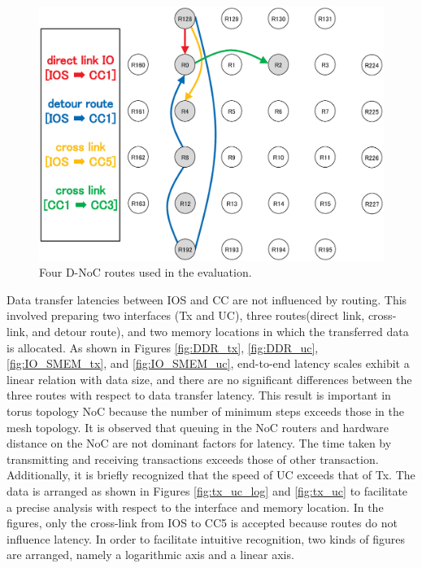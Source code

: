 \documentclass[conference,compsoc]{IEEEtran}
\begin{document}
\begin{figure}[t]
  \centering
  \includegraphics[width=0.8\linewidth]{../figure/noc_routes.eps}
  \caption{\label{fig:noc_routes}
    Four D-NoC routes used in the evaluation.}
\end{figure}

Data transfer latencies between IOS and CC are not influenced by routing.
This involved preparing two interfaces (Tx and UC), three routes(direct link, cross-link, and detour route), and two memory locations in which the transferred data is allocated.
As shown in Figures \ref{fig:DDR_tx}, \ref{fig:DDR_uc}, \ref{fig:IO_SMEM_tx}, and \ref{fig:IO_SMEM_uc}, 
end-to-end latency scales exhibit a linear relation with data size, and there are no significant differences between the three routes with respect to data transfer latency.
This result is important in torus topology NoC because the number of minimum steps exceeds those in the mesh topology. 
It is observed that queuing in the NoC routers and hardware distance on the NoC are not dominant factors for latency.
The time taken by transmitting and receiving transactions exceeds those of other transaction.
Additionally, it is briefly recognized that the speed of UC exceeds that of Tx.
The data is arranged as shown in Figures \ref{fig:tx_uc_log} and \ref{fig:tx_uc} to facilitate a precise analysis with
respect to the interface and memory location.
In the figures, only the cross-link from IOS to CC5 is accepted because routes do not influence latency.
In order to facilitate intuitive recognition, two kinds of figures are arranged, namely a logarithmic axis and a linear axis.
\end{document}

